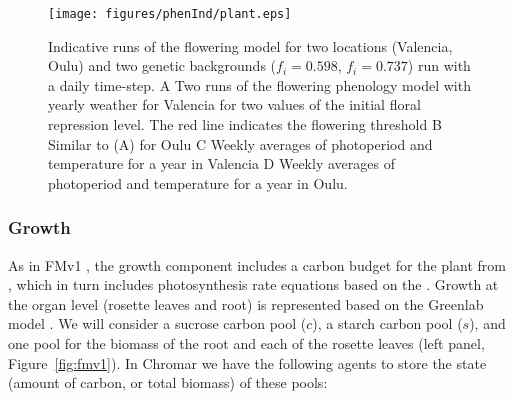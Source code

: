 \begin{figure}[tb]
  \centering
  \texttt{[image: figures/phenInd/plant.eps]}
  \caption{Indicative runs of the flowering model for two locations (Valencia,
    Oulu) and two genetic backgrounds ($f_i=0.598$, $f_i=0.737$) run with a
    daily time-step. A Two runs of the flowering phenology model with yearly
    weather for Valencia for two values of the initial floral repression
    level. The red line indicates the flowering threshold B Similar to (A) for
    Oulu C Weekly averages of photoperiod and temperature for a year in Valencia
    D Weekly averages of photoperiod and temperature for a year in Oulu.}
  \label{fig:vegInd}
\end{figure}


\subsubsection*{Growth}
As in FMv1 \citep{chew_multiscale_2014}, the growth component includes a carbon
budget for the plant from \citet{rasse_leaf_2006}, which in turn includes
photosynthesis rate equations based on the
\citet{farquhar_biochemical_1980}. Growth at the organ level (rosette leaves and
root) is represented based on the Greenlab model
\citep{christophe_model-based_2008}. We will consider a sucrose carbon pool
(\(c\)), a starch carbon pool (\(s\)), and one pool for the biomass of the root
and each of the rosette leaves (left panel, Figure~\ref{fig:fmv1}). In Chromar
we have the following agents to store the state (amount of carbon, or total
biomass) of these pools:
